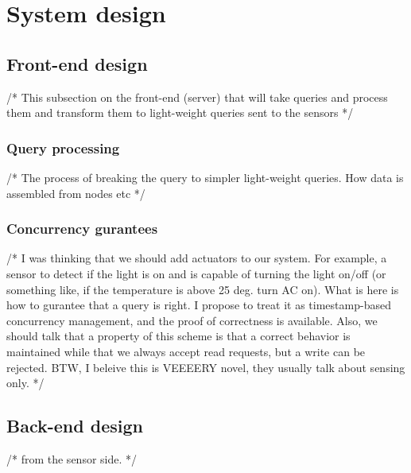 \section{System design}\label{sec:design}

\subsection{Front-end design}
/* This subsection on the front-end (server) that will take queries and process them and transform them to light-weight queries sent to the sensors */

\subsubsection{Query processing}
/* The process of breaking the query to simpler light-weight queries. How data is assembled from nodes etc */

\subsubsection{Concurrency gurantees}
/* I was thinking that we should add actuators to our system. For example, a sensor to detect if the light is on and is capable of turning the light on/off (or something like, if the temperature is above 25 deg. turn AC on). What is here is how to gurantee that a query is right. I propose to treat it as timestamp-based concurrency management, and the proof of correctness is available. Also, we should talk that a property of this scheme is that a correct behavior is maintained while that we always accept read requests, but a write can be rejected.
BTW, I beleive this is VEEEERY novel, they usually talk about sensing only.
 */

\subsection{Back-end design}
/* from the sensor side. */
